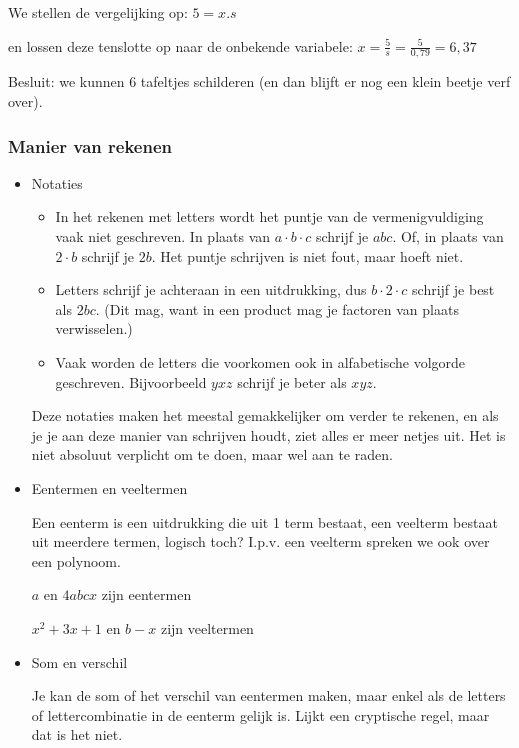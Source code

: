 We stellen de vergelijking op: $5=x.s$ 

en lossen deze tenslotte op naar de onbekende variabele: $x=\frac{5}{s}=\frac{5}{0,79}=6,37$

Besluit: we kunnen 6 tafeltjes schilderen (en dan blijft er nog een
klein beetje verf over).


\subsubsection{Manier van rekenen}

\begin{itemize}
	\item{Notaties}
	\begin{itemize}
		\item In het rekenen met letters wordt het puntje van de vermenigvuldiging
		vaak niet geschreven. In plaats van $a\cdot b\cdot c$ schrijf je
		$abc$. Of, in plaats van $2\cdot b$ schrijf je $2b$. Het puntje
		schrijven is niet fout, maar hoeft niet.
		\item Letters schrijf je achteraan in een uitdrukking, dus $b\cdot2\cdot c$
		schrijf je best als $2bc$. (Dit mag, want in een product mag je factoren
		van plaats verwisselen.)
		\item Vaak worden de letters die voorkomen ook in alfabetische volgorde
		geschreven. Bijvoorbeeld $yxz$ schrijf je beter als $xyz$. 
	\end{itemize}
	\noindent Deze notaties maken het meestal gemakkelijker om verder
	te rekenen, en als je je aan deze manier van schrijven houdt, ziet
	alles er meer netjes uit. Het is niet absoluut verplicht om te doen,
	maar wel aan te raden.
	
	
	\item{Eentermen en veeltermen}
	
	Een eenterm is een uitdrukking die uit 1 term bestaat, een veelterm
	bestaat uit meerdere termen, logisch toch? I.p.v. een veelterm spreken
	we ook over een polynoom.
	
	\textbullet{} $a$ en $4abcx$ zijn eentermen
	
	\textbullet{} $x^{2}+3x+1$ en $b-x$ zijn veeltermen
	
	
	\item{Som en verschil}
	
	Je kan de som of het verschil van eentermen maken, maar enkel als
	de letters of lettercombinatie in de eenterm gelijk is. Lijkt een
	cryptische regel, maar dat is het niet. 
	

\end{itemize}
